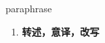 
\begin{frame}
{\huge paraphrase}
\begin{center}
\begin{enumerate}\Large
  \item \textbf{转述，意译，改写}
\end{enumerate}
\end{center}
\end{frame}
